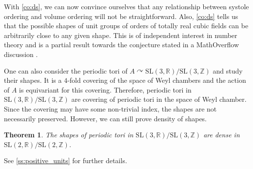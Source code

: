 \documentclass[11pt,letterpaper]{amsart}
\newtheorem{theorem}{Theorem}[section]
\theoremstyle{definition}
\theoremstyle{remark}
\renewcommand{\rm}[1]{\mathrm{#1}}
\newcommand{\bb}[1]{\mathbb{#1}}
\newcommand{\R}{\bb R}
\newcommand{\Z}{\bb Z}
\newcommand{\SL}{\rm{SL}}
\newcommand{\jialun}{\color{blue}}
\begin{document}
	
	With \cref{co:ds}, we can now convince ourselves that any relationship between systole ordering and volume ordering will not be straightforward.
 Also, \cref{co:ds} tells us that the possible shapes of unit groups of orders of totally real cubic fields can be arbitrarily close to any given shape. This is of independent interest in number theory and is a partial result towards the conjecture stated in a MathOverflow discussion \cite{mathoverflow_disc}. %
 
 
 
One can also consider the periodic tori of $A \curvearrowright \SL(3,\R)/\SL(3,\Z)$ %
and study their shapes. 
{ 
It is a $4$-fold covering of the space of Weyl chambers and the action of $A$ is equivariant for this covering.
Therefore, periodic tori in $\SL(3,\R)/\SL(3,\Z)$ are covering of periodic tori in the space of Weyl chamber.
Since the covering may have some non-trivial index, the shapes are not necessarily preserved.
However, we can still prove density of shapes.
}
\begin{theorem}
    The shapes of periodic tori in $\SL(3,\R)/\SL(3,\Z)$ are dense in $\SL(2,\R)/\SL(2,\Z)$.
\end{theorem}
See \cref{ss:positive_units} for further details.
\end{document}
